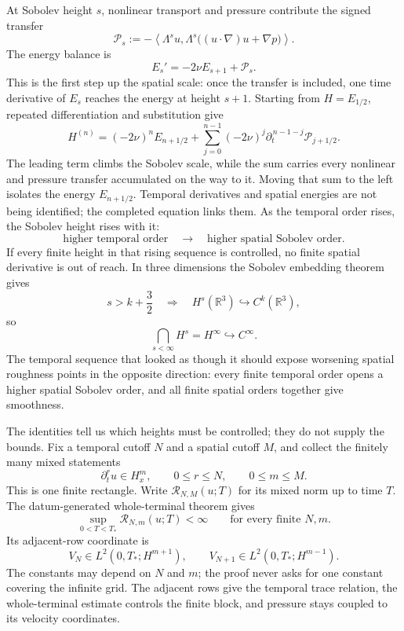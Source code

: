 \documentclass[11pt]{article}
\begin{document}
At Sobolev height \(s\), nonlinear transport and pressure contribute the signed transfer
\[
\mathcal P_s
:=-
\left\langle
\Lambda^su,
\Lambda^s\bigl((u\cdot\nabla)u+\nabla p\bigr)
\right\rangle .
\]
The energy balance is
\[
E_s'=-2\nu E_{s+1}+\mathcal P_s.
\]
This is the first step up the spatial scale: once the transfer is included, one time derivative of \(E_s\) reaches the energy at height \(s+1\). Starting from \(H=E_{1/2}\), repeated differentiation and substitution give
\[
H^{(n)}
=(-2\nu)^nE_{n+1/2}
+\sum_{j=0}^{n-1}
(-2\nu)^j
\partial_t^{\,n-1-j}\mathcal P_{j+1/2}.
\]
The leading term climbs the Sobolev scale, while the sum carries every nonlinear and pressure transfer accumulated on the way to it. Moving that sum to the left isolates the energy \(E_{n+1/2}\).
Temporal derivatives and spatial energies are not being identified; the completed equation links them. As the temporal order rises, the Sobolev height rises with it:
\[
\text{higher temporal order}
\quad\longrightarrow\quad
\text{higher spatial Sobolev order}.
\]
If every finite height in that rising sequence is controlled, no finite spatial derivative is out of reach. In three dimensions the Sobolev embedding theorem gives
\[
s>k+\frac32
\quad\Longrightarrow\quad
H^s(\mathbb R^3)\hookrightarrow C^k(\mathbb R^3),
\]
so
\[
\bigcap_{s<\infty}H^s
=H^\infty
\hookrightarrow C^\infty.
\]
The temporal sequence that looked as though it should expose worsening spatial roughness points in the opposite direction: every finite temporal order opens a higher spatial Sobolev order, and all finite spatial orders together give smoothness.

The identities tell us which heights must be controlled; they do not supply the bounds. Fix a temporal cutoff \(N\) and a spatial cutoff \(M\), and collect the finitely many mixed statements
\[
\partial_t^ru\in H_x^m,
\qquad 0\leq r\leq N,
\qquad 0\leq m\leq M.
\]
This is one finite rectangle. Write \(\mathcal R_{N,M}(u;T)\) for its mixed norm up to time \(T\). The datum-generated whole-terminal theorem gives
\[
\sup_{0<T<T_*}\mathcal R_{N,m}(u;T)<\infty
\qquad\text{for every finite }N,m.
\]
Its adjacent-row coordinate is
\[
V_N\in L^2(0,T_*;H^{m+1}),
\qquad
V_{N+1}\in L^2(0,T_*;H^{m-1}).
\]
The constants may depend on \(N\) and \(m\); the proof never asks for one constant covering the infinite grid. The adjacent rows give the temporal trace relation, the whole-terminal estimate controls the finite block, and pressure stays coupled to its velocity coordinates.
\end{document}
